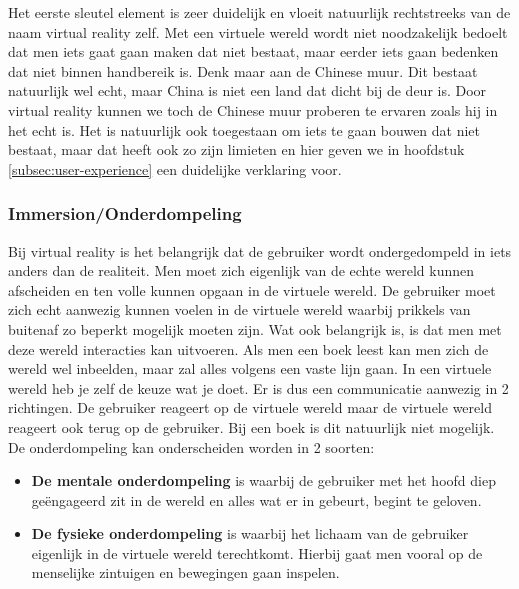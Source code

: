 Het eerste sleutel element is zeer duidelijk en vloeit natuurlijk rechtstreeks van de naam virtual reality zelf. Met een virtuele wereld wordt niet noodzakelijk bedoelt dat men iets gaat gaan maken dat niet bestaat, maar eerder iets gaan bedenken dat niet binnen handbereik is. Denk maar aan de Chinese muur. Dit bestaat natuurlijk wel echt, maar China is niet een land dat dicht bij de deur is. Door virtual reality kunnen we toch de Chinese muur proberen te ervaren zoals hij in het echt is. Het is natuurlijk ook toegestaan om iets te gaan bouwen dat niet bestaat, maar dat heeft ook zo zijn limieten en hier geven we in hoofdstuk \ref{subsec:user-experience} een duidelijke verklaring voor.

\subsubsection{Immersion/Onderdompeling}
\label{ssubsec:immersion}
Bij virtual reality is het belangrijk dat de gebruiker wordt ondergedompeld in iets anders dan de realiteit. Men moet zich eigenlijk van de echte wereld kunnen afscheiden en ten volle kunnen opgaan in de virtuele wereld. De gebruiker moet zich echt aanwezig kunnen voelen in de virtuele wereld waarbij prikkels van buitenaf zo beperkt mogelijk moeten zijn. Wat ook belangrijk is, is dat men met deze wereld interacties kan uitvoeren. Als men een boek leest kan men zich de wereld wel inbeelden, maar zal alles volgens een vaste lijn gaan. In een virtuele wereld heb je zelf de keuze wat je doet. Er is dus een communicatie aanwezig in 2 richtingen. De gebruiker reageert op de virtuele wereld maar de virtuele wereld reageert ook terug op de gebruiker. Bij een boek is dit natuurlijk niet mogelijk. De onderdompeling kan onderscheiden worden in 2 soorten:

\begin{itemize}
	\item \textbf{De mentale onderdompeling} is waarbij de gebruiker met het hoofd diep geëngageerd zit in de wereld en alles wat er in gebeurt, begint te geloven.
	\item \textbf{De fysieke onderdompeling} is waarbij het lichaam van de gebruiker eigenlijk in de virtuele wereld terechtkomt. Hierbij gaat men vooral op de menselijke zintuigen en bewegingen gaan inspelen.
\end{itemize}

